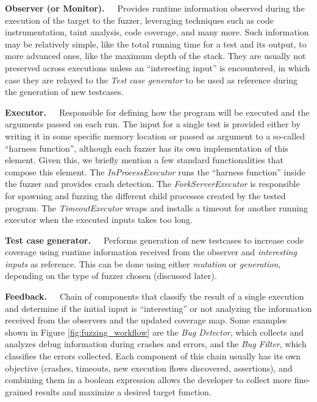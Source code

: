 \textbf{Observer (or Monitor).}\ \ \ Provides runtime information observed during the execution of the target to the fuzzer, leveraging techniques such as code instrumentation, taint analysis, code coverage, and many more. Such information may be relatively simple, like the total running time for a test and its output, to more advanced ones, like the maximum depth of the stack. They are usually not preserved across executions unless an ``interesting input'' is encountered, in which case they are relayed to the \textit{Test case generator} to be used as reference during the generation of new testcases. 

\textbf{Executor.}\ \ \ Responsible for defining how the program will be executed and the arguments passed on each run. The input for a single test is provided either by writing it in some specific memory location or passed as argument to a so-called ``harness function'', although each fuzzer has its own implementation of this element. Given this, we briefly mention a few standard functionalities that compose this element. The \textit{InProcessExecutor} runs the ``harness function'' inside the fuzzer and provides crash detection. The \textit{ForkServerExecutor} is responsible for spawning and fuzzing the different child processes created by the tested program. The \textit{TimeoutExecutor} wraps and installs a timeout for another running executor when the executed inputs takes too long.

\textbf{Test case generator.}\ \ \ Performs generation of new testcases to increase code coverage using runtime information received from the observer and \textit{interesting inputs} as reference. This can be done using either \textit{mutation} or \textit{generation}, depending on the type of fuzzer chosen (discussed later).

\textbf{Feedback.}\ \ \ Chain of components that classify the result of a single execution and determine if the initial input is ``interesting'' or not analyzing the information received from the observers and the updated coverage map. Some examples shown in Figure \ref{fig:fuzzing_workflow} are the \textit{Bug Detector}, which collects and analyzes debug information during crashes and errors, and the \textit{Bug Filter}, which classifies the errors collected.
Each component of this chain usually has its own objective (crashes, timeouts, new execution flows discovered, assertions), and combining them in a boolean expression allows the developer to collect more fine-grained results and maximize a desired target function.

